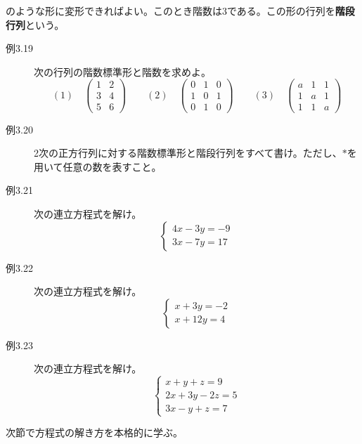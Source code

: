 \documentclass[10pt]{jsreport}
\theoremstyle{definition}%
\numberwithin{equation}{section}%
\begin{document}
のような形に変形できればよい。このとき階数は3である。この形の行列を{\bf 階段行列}という。
\begin{description}
  \item[例3.19] 次の行列の階数標準形と階数を求めよ。
  \begin{equation}
    (1) \quad \begin{pmatrix}
      1 & 2 \\
      3 & 4 \\
      5 & 6
    \end{pmatrix} \quad \quad (2)\quad \begin{pmatrix}
      0 & 1 & 0 \\
      1 & 0 & 1 \\
      0 & 1 & 0
    \end{pmatrix}\quad \quad (3)\quad \begin{pmatrix}
      a & 1 & 1 \\
      1 & a & 1 \\
      1 & 1 & a
    \end{pmatrix}
  \end{equation}
  \item[例3.20] 2次の正方行列に対する階数標準形と階段行列をすべて書け。ただし、$*$を用いて任意の数を表すこと。
  \item[例3.21] 次の連立方程式を解け。
  \begin{equation}
  \begin{cases}
    4x-3y=-9\\
    3x-7y=17
  \end{cases}
  \end{equation}
  \item[例3.22] 次の連立方程式を解け。
  \begin{equation}
  \begin{cases}
    x+3y=-2\\
    x+12y=4
  \end{cases}
  \end{equation}
  \item[例3.23] 次の連立方程式を解け。
  \begin{equation}
  \begin{cases}
    x+y+z=9\\
    2x+3y-2z=5\\
    3x-y+z=7
  \end{cases}
  \end{equation}
\end{description}
次節で方程式の解き方を本格的に学ぶ。
\end{document}
